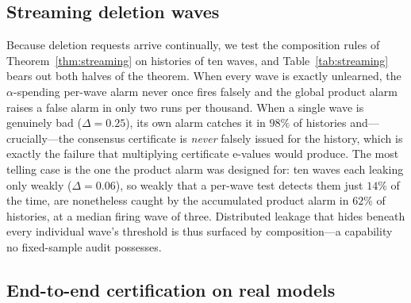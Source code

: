 \subsection{Streaming deletion waves}\label{sec:exp-streaming}

Because deletion requests arrive continually, we test the composition rules of
Theorem~\ref{thm:streaming} on histories of ten waves, and Table~\ref{tab:streaming}
bears out both halves of the theorem. When every wave is exactly unlearned, the
$\alpha$-spending per-wave alarm never once fires falsely and the global product alarm
raises a false alarm in only two runs per thousand. When a single wave is genuinely bad
($\Delta = 0.25$), its own alarm catches it in $98\%$ of histories and---crucially---the
consensus certificate is \emph{never} falsely issued for the history, which is exactly
the failure that multiplying certificate e-values would produce. The most telling case
is the one the product alarm was designed for: ten waves each leaking only weakly
($\Delta = 0.06$), so weakly that a per-wave test detects them just $14\%$ of the time,
are nonetheless caught by the accumulated product alarm in $62\%$ of histories, at a
median firing wave of three. Distributed leakage that hides beneath every individual
wave's threshold is thus surfaced by composition---a capability no fixed-sample audit
possesses.

\begin{table}[t]
\centering\small
\caption{Streaming composition over $K{=}10$ waves ($512$ pairs each, $500$ histories).
The dagger excludes the genuinely bad wave. Bold marks the two payoffs: no false
history-wide certificate, and distributed weak leakage caught only by the product
alarm.}
\label{tab:streaming}

\end{table}

\subsection{End-to-end certification on real models}\label{sec:exp-e2e}

